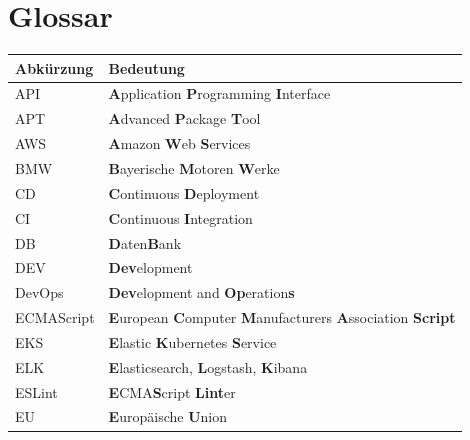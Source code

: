 \documentclass[11pt, a4paper, oneside]{scrartcl}
\begin{document}
        \newpage

    \tableofcontents

        \newpage
    
    \section*{Glossar}
        \setlength{\LTleft}{0pt}  %
        \setlength{\LTright}{\fill} %
        \begin{longtable}{|l|l|} %
            \hline
            \textbf{Abkürzung} & \textbf{Bedeutung}\\
            \hline
            API & \textbf{A}pplication \textbf{P}rogramming \textbf{I}nterface\\
            \hline
            APT & \textbf{A}dvanced \textbf{P}ackage \textbf{T}ool\\
            \hline
            AWS & \textbf{A}mazon \textbf{W}eb \textbf{S}ervices\\
            \hline
            BMW & \textbf{B}ayerische \textbf{M}otoren \textbf{W}erke\\
            \hline
            CD & \textbf{C}ontinuous \textbf{D}eployment\\
            \hline
            CI & \textbf{C}ontinuous \textbf{I}ntegration\\
            \hline
            DB & \textbf{D}aten\textbf{B}ank\\
            \hline
            DEV & \textbf{Dev}elopment\\
            \hline
            DevOps & \textbf{Dev}elopment and \textbf{Op}eration\textbf{s}\\
            \hline
            ECMAScript & \textbf{E}uropean \textbf{C}omputer \textbf{M}anufacturers
                \textbf{A}ssociation \textbf{Script}\\
            \hline
            EKS & \textbf{E}lastic \textbf{K}ubernetes \textbf{S}ervice\\
            \hline
            ELK & \textbf{E}lasticsearch, \textbf{L}ogstash, \textbf{K}ibana\\
            \hline
            ESLint & \textbf{E}CMA\textbf{S}cript \textbf{Lint}er\\
            \hline
            EU & \textbf{E}uropäische \textbf{U}nion\\

\end{longtable}
\end{document}
